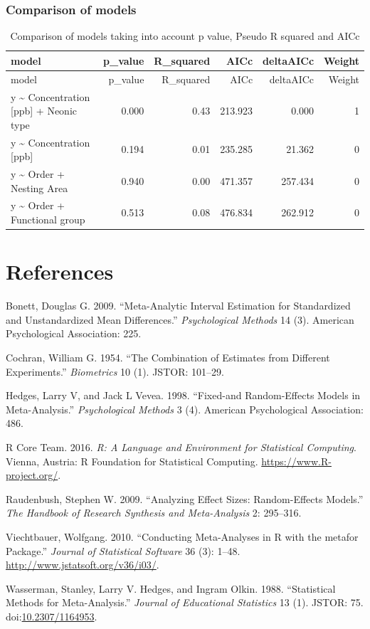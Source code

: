 \documentclass[]{elsarticle} %
\begin{document}
\subsubsection{Comparison of models}\label{comparison-of-models-2}

\begin{longtable}[c]{@{}lrrrrr@{}}
\caption{Comparison of models taking into account p value, Pseudo R
squared and AICc}\tabularnewline
\toprule
model & p\_value & R\_squared & AICc & deltaAICc & Weight\tabularnewline
\midrule
\endfirsthead
\toprule
model & p\_value & R\_squared & AICc & deltaAICc & Weight\tabularnewline
\midrule
\endhead
y \textasciitilde{} Concentration {[}ppb{]} + Neonic type & 0.000 & 0.43
& 213.923 & 0.000 & 1\tabularnewline
y \textasciitilde{} Concentration {[}ppb{]} & 0.194 & 0.01 & 235.285 &
21.362 & 0\tabularnewline
y \textasciitilde{} Order + Nesting Area & 0.940 & 0.00 & 471.357 &
257.434 & 0\tabularnewline
y \textasciitilde{} Order + Functional group & 0.513 & 0.08 & 476.834 &
262.912 & 0\tabularnewline
\bottomrule
\end{longtable}

\section*{References}\label{references}

Bonett, Douglas G. 2009. ``Meta-Analytic Interval Estimation for
Standardized and Unstandardized Mean Differences.'' \emph{Psychological
Methods} 14 (3). American Psychological Association: 225.

Cochran, William G. 1954. ``The Combination of Estimates from Different
Experiments.'' \emph{Biometrics} 10 (1). JSTOR: 101--29.

Hedges, Larry V, and Jack L Vevea. 1998. ``Fixed-and Random-Effects
Models in Meta-Analysis.'' \emph{Psychological Methods} 3 (4). American
Psychological Association: 486.

R Core Team. 2016. \emph{R: A Language and Environment for Statistical
Computing}. Vienna, Austria: R Foundation for Statistical Computing.
\url{https://www.R-project.org/}.

Raudenbush, Stephen W. 2009. ``Analyzing Effect Sizes: Random-Effects
Models.'' \emph{The Handbook of Research Synthesis and Meta-Analysis} 2:
295--316.

Viechtbauer, Wolfgang. 2010. ``Conducting Meta-Analyses in R with the
metafor Package.'' \emph{Journal of Statistical Software} 36 (3): 1--48.
\url{http://www.jstatsoft.org/v36/i03/}.

Wasserman, Stanley, Larry V. Hedges, and Ingram Olkin. 1988.
``Statistical Methods for Meta-Analysis.'' \emph{Journal of Educational
Statistics} 13 (1). JSTOR: 75.
doi:\href{http://dx.doi.org/10.2307/1164953}{10.2307/1164953}.
\end{document}
